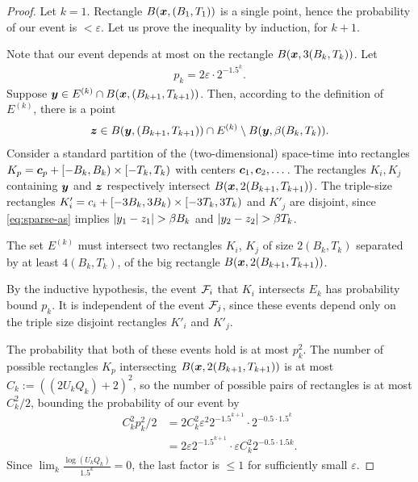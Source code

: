 \documentclass[12pt]{memoir}
\renewcommand{\le}{\leq}
\def\B{B}
\def\U{U}
\newcommand{\Tu}{T}
\begin{document}
\begin{proof}
Let \( k=1 \).
Rectangle \( B(\vek{x},(\B_1, \Tu_{1})) \) is a single point, hence
the probability of our event is \( <\varepsilon \).
Let us prove the inequality by induction, for \( k+1 \).

Note that our 
event depends at most on the rectangle \( B(\vek{x},3(\B_{k}, \Tu_{k})) \).
Let
\begin{align*}
   p_{k}=2\varepsilon\cdot 2^{-1.5^{k}}.
\end{align*}
Suppose \( \vek{y} \in E^{(k)}\cap B(\vek{x},(\B_{k+1}, \Tu_{k+1})  ) \).
Then, according to the definition of \( E^{(k)} \),  there is a point
\begin{align}\label{eq:sparse-as}
 \vek{z} \in
 B(\vek{y},(\B_{k+1},\Tu_{k+1}))\cap E^{(k)}\setminus B(\vek{y},\beta(\B_{k}, \Tu_{k})).
 \end{align}
Consider a standard partition of the (two-dimensional) space-time into
rectangles \( K_{p}=\vek{c}_{p}+\lint{-\B_{k}}{\B_k}\times \lint{-\Tu_{k}}{\Tu_{k}} \)
with centers \( \boldsymbol{c}_{1},\boldsymbol{c}_{2},\dots \).
The rectangles \( K_{i},K_{j} \) containing \( \boldsymbol{y} \) and \( \boldsymbol{z} \)
respectively intersect \( B(\vek{x}, 2(\B_{k+1}, \Tu_{k+1})) \).
The triple-size rectangles 
\( K'_{i}=c_{i} + \lint{-3\B_{k}}{3\B_k}\times \lint{-3\Tu_{k}}{3\Tu_{k}} \) and
\( K'_{j} \) are disjoint, since \eqref{eq:sparse-as} implies
 \( \abs{y_1 - z_1}>\beta\B_{k} \) and \( \abs{y_2 - z_2}>\beta\Tu_{k} \).

The set \( E^{(k)} \) must intersect two rectangles \( K_{i} \),
\( K_{j} \) of size \( 2(\B_{k}, \Tu_{k}) \) separated by at least \( 4(\B_{k}, \Tu_{k}) \),
of the big rectangle \( B(\vek{x},2(\B_{k+1}, \Tu_{k+1})) \).

By the inductive hypothesis, the event \( \mathcal{F}_{i} \) that
\( K_{i} \) intersects \( E_{k} \) has probability bound \( p_{k} \).
It is independent of the event \( \mathcal{F}_{j} \), since these events depend
only on the triple size disjoint rectangles \( K'_{i} \) and \( K'_{j} \).

The probability that both of these events hold is at most \( p_{k}^{2} \).
The number of possible rectangles
\( K_{p} \) intersecting \( B(\vek{x},2(\B_{k+1}, \Tu_{k+1})) \) is
at most
\( C_{k}:=((2\U_{k} Q_{k})+2)^{2} \), so the number of possible pairs of rectangles
is at most \( C_{k}^{2}/2 \), bounding the probability of our event by
 \begin{align*}
   C_{k}^{2}p_{k}^{2}/2
    &=
      2 C_{k}^{2}\varepsilon^{2} 2^{-1.5^{k+1}}\cdot 2^{-0.5\cdot 1.5^{k}}
   \\ &=2\varepsilon 2^{-1.5^{k+1}} \cdot \varepsilon
        C_{k}^{2}2^{-0.5\cdot 1.5{k}}.
 \end{align*}
Since \( \lim_{k}\frac{\log{(\U_{k} Q_k)}}{1.5^k}=0 \),
the last factor is \( \le 1 \) for sufficiently small  \( \varepsilon \).
\end{proof}
\end{document}
